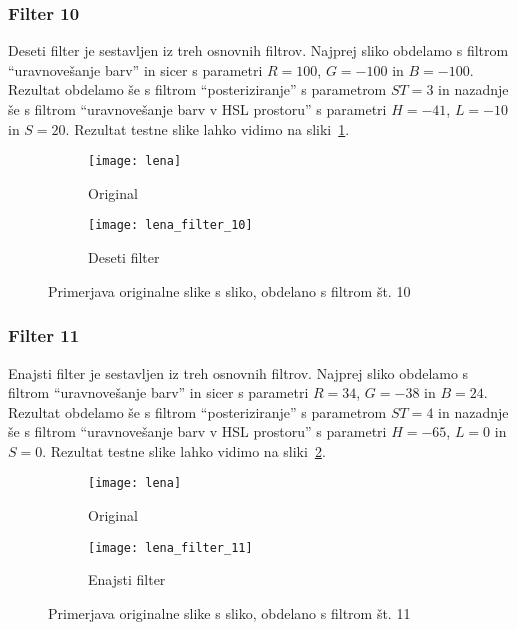 \subsubsection*{Filter 10}
Deseti filter je sestavljen iz treh osnovnih filtrov. Najprej sliko obdelamo s
filtrom ``uravnovešanje barv'' in sicer s parametri $R = 100$, $G = -100$ in
$B = -100$. Rezultat obdelamo še s filtrom ``posteriziranje'' s parametrom
$ST= 3$ in nazadnje še s filtrom ``uravnovešanje barv v HSL prostoru'' s
parametri $H = -41$, $L = -10$ in $S = 20$. Rezultat testne slike lahko
vidimo na sliki~\ref{fig:lena_filter_10}.

\begin{figure}[!ht]
    \centering
    \begin{subfigure}[b]{0.4\textwidth}
        \texttt{[image: lena]}
        \caption{Original}
    \end{subfigure}
    \begin{subfigure}[b]{0.4\textwidth}
        \texttt{[image: lena\_filter\_10]}
        \caption{Deseti filter}
    \end{subfigure}
    \caption{Primerjava originalne slike s sliko, obdelano s filtrom št. 10}
    \label{fig:lena_filter_10}
\end{figure}


\subsubsection*{Filter 11}
Enajsti filter je sestavljen iz treh osnovnih filtrov. Najprej sliko obdelamo s
filtrom ``uravnovešanje barv'' in sicer s parametri $R = 34$, $G = -38$ in
$B = 24$. Rezultat obdelamo še s filtrom ``posteriziranje'' s parametrom
$ST= 4$ in nazadnje še s filtrom ``uravnovešanje barv v HSL prostoru'' s
parametri $H = -65$, $L = 0$ in $S = 0$. Rezultat testne slike lahko
vidimo na sliki~\ref{fig:lena_filter_11}.

\begin{figure}[!ht]
    \centering
    \begin{subfigure}[b]{0.4\textwidth}
        \texttt{[image: lena]}
        \caption{Original}
    \end{subfigure}
    \begin{subfigure}[b]{0.4\textwidth}
        \texttt{[image: lena\_filter\_11]}
        \caption{Enajsti filter}
    \end{subfigure}
    \caption{Primerjava originalne slike s sliko, obdelano s filtrom št. 11}
    \label{fig:lena_filter_11}
\end{figure}


